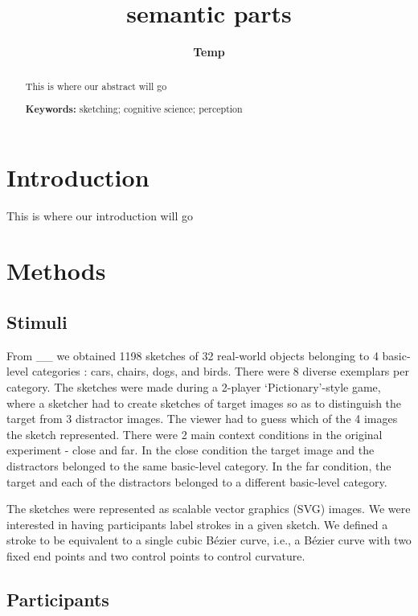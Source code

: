 \documentclass[10pt,letterpaper]{article}
\title{semantic parts}
\author{{\large \bf Temp} \AND {\large \bf Temp}
  }
\begin{document}
\maketitle 


\begin{abstract}
This is where our abstract will go

\textbf{Keywords:} 
sketching; cognitive science; perception
\end{abstract}



\section{Introduction}
This is where our introduction will go




\section{Methods}


\subsection{Stimuli}

 From \_\_ we obtained 1198 sketches of 32 real-world objects belonging to 4 basic-level categories : cars, chairs, dogs, and birds. There were 8 diverse exemplars per category.
The sketches were made during a 2-player ‘Pictionary’-style game, where a sketcher had to create sketches of target images so as to distinguish the target from 3 distractor images. The viewer had to guess which of the 4 images the sketch represented.
There were 2 main context conditions in the original experiment - close and far. In the close condition the target image and the distractors belonged to the same basic-level category. In the far condition, the target and each of the distractors belonged to a different basic-level category.

The sketches were represented as scalable vector graphics (SVG) images. We were interested in having participants label strokes in a given sketch. We defined a stroke to be equivalent to a single cubic Bézier curve, i.e., a Bézier curve with two fixed end points and two control points to control curvature.



\subsection{Participants}
\end{document}
